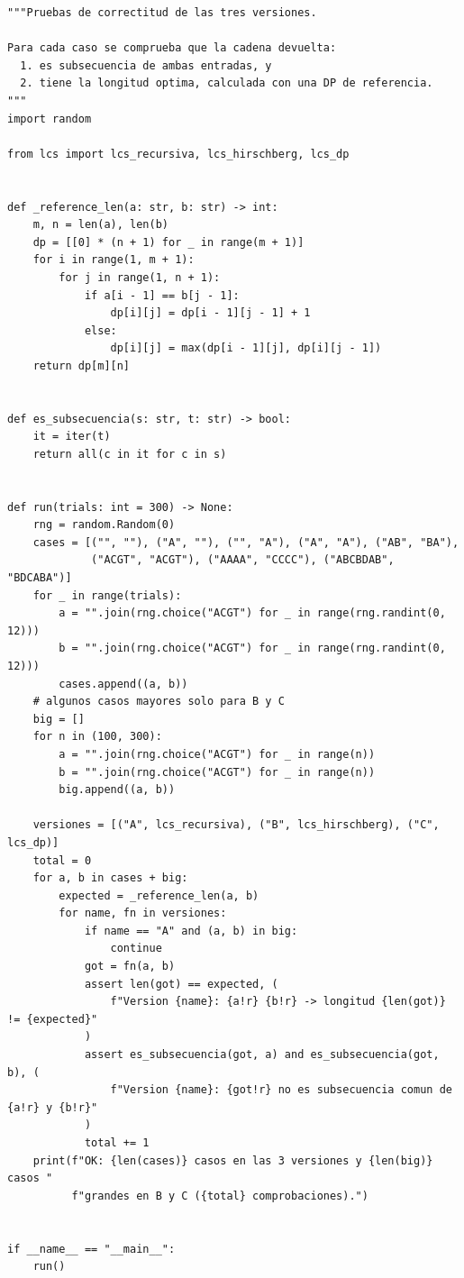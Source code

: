 \documentclass[11pt,a4paper]{article}
\begin{document}
\begin{lstlisting}[style=py, caption={\texttt{src/test\_lcs.py}}]
"""Pruebas de correctitud de las tres versiones.

Para cada caso se comprueba que la cadena devuelta:
  1. es subsecuencia de ambas entradas, y
  2. tiene la longitud optima, calculada con una DP de referencia.
"""
import random

from lcs import lcs_recursiva, lcs_hirschberg, lcs_dp


def _reference_len(a: str, b: str) -> int:
    m, n = len(a), len(b)
    dp = [[0] * (n + 1) for _ in range(m + 1)]
    for i in range(1, m + 1):
        for j in range(1, n + 1):
            if a[i - 1] == b[j - 1]:
                dp[i][j] = dp[i - 1][j - 1] + 1
            else:
                dp[i][j] = max(dp[i - 1][j], dp[i][j - 1])
    return dp[m][n]


def es_subsecuencia(s: str, t: str) -> bool:
    it = iter(t)
    return all(c in it for c in s)


def run(trials: int = 300) -> None:
    rng = random.Random(0)
    cases = [("", ""), ("A", ""), ("", "A"), ("A", "A"), ("AB", "BA"),
             ("ACGT", "ACGT"), ("AAAA", "CCCC"), ("ABCBDAB", "BDCABA")]
    for _ in range(trials):
        a = "".join(rng.choice("ACGT") for _ in range(rng.randint(0, 12)))
        b = "".join(rng.choice("ACGT") for _ in range(rng.randint(0, 12)))
        cases.append((a, b))
    # algunos casos mayores solo para B y C
    big = []
    for n in (100, 300):
        a = "".join(rng.choice("ACGT") for _ in range(n))
        b = "".join(rng.choice("ACGT") for _ in range(n))
        big.append((a, b))

    versiones = [("A", lcs_recursiva), ("B", lcs_hirschberg), ("C", lcs_dp)]
    total = 0
    for a, b in cases + big:
        expected = _reference_len(a, b)
        for name, fn in versiones:
            if name == "A" and (a, b) in big:
                continue
            got = fn(a, b)
            assert len(got) == expected, (
                f"Version {name}: {a!r} {b!r} -> longitud {len(got)} != {expected}"
            )
            assert es_subsecuencia(got, a) and es_subsecuencia(got, b), (
                f"Version {name}: {got!r} no es subsecuencia comun de {a!r} y {b!r}"
            )
            total += 1
    print(f"OK: {len(cases)} casos en las 3 versiones y {len(big)} casos "
          f"grandes en B y C ({total} comprobaciones).")


if __name__ == "__main__":
    run()
\end{lstlisting}
\end{document}
